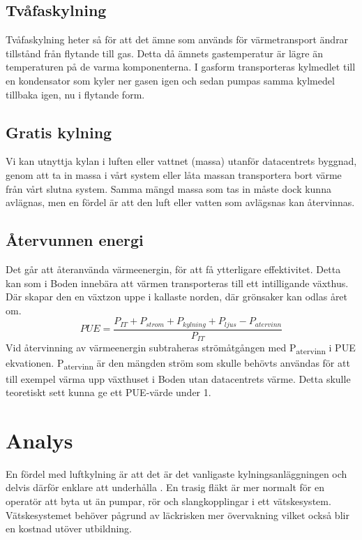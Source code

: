 \documentclass[conference,a4paper]{IEEEtran}
\begin{document}
\subsection{Tvåfaskylning}
Tvåfaskylning heter så för att det ämne som används för värmetransport ändrar tillstånd från flytande till gas. Detta då ämnets gastemperatur är lägre 
än temperaturen på de varma komponenterna. I gasform transporteras kylmedlet till en kondensator som kyler ner gasen igen och sedan pumpas samma kylmedel tillbaka igen, 
nu i flytande form.  
\subsection{Gratis kylning}
Vi kan utnyttja kylan i luften eller vattnet (massa) utanför datacentrets byggnad, genom att ta in massa i vårt system eller låta massan transportera bort värme från vårt slutna 
system. Samma mängd massa som tas in måste dock kunna avlägnas, men en fördel är att den luft eller vatten som avlägsnas kan återvinnas.
\subsection{Återvunnen energi}
Det går att återanvända värmeenergin, för att få ytterligare effektivitet. Detta kan som i Boden \cite{free-cooling1} innebära att värmen transporteras 
till ett intilligande växthus. Där skapar den en växtzon uppe i kallaste norden, där grönsaker kan odlas året om. 
\begin{equation}
    PUE = \frac{P_{IT} + P_{strom} + P_{kylning} + P_{ljus} - P_{atervinn}}{P_{IT}}
\end{equation}
Vid återvinning av värmeenergin\cite{modelling2} subtraheras strömåtgången med P\textsubscript{atervinn} i PUE ekvationen. P\textsubscript{atervinn} är den mängden ström 
som skulle behövts användas för att till exempel värma upp växthuset i Boden utan datacentrets värme. Detta skulle teoretiskt sett kunna ge
ett PUE-värde under 1.

\section{Analys}
En fördel med luftkylning är att det är det vanligaste kylningsanläggningen och delvis därför enklare att underhålla \cite{coolingcompare1}. 
En trasig fläkt är mer normalt för en operatör att byta ut än pumpar, rör och slangkopplingar i ett vätskesystem. Vätskesystemet behöver pågrund av läckrisken mer övervakning 
vilket också blir en kostnad utöver utbildning.
\end{document}
